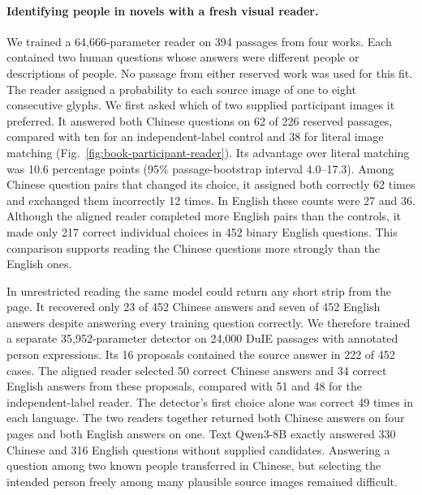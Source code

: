 \paragraph{Identifying people in novels with a fresh visual reader.}
We trained a 64,666-parameter reader on 394 passages from four works. Each contained two human questions whose answers were different people or descriptions of people. No passage from either reserved work was used for this fit. The reader assigned a probability to each source image of one to eight consecutive glyphs. We first asked which of two supplied participant images it preferred. It answered both Chinese questions on 62 of 226 reserved passages, compared with ten for an independent-label control and 38 for literal image matching (Fig.~\ref{fig:book-participant-reader}). Its advantage over literal matching was 10.6 percentage points (95\% passage-bootstrap interval 4.0--17.3). Among Chinese question pairs that changed its choice, it assigned both correctly 62 times and exchanged them incorrectly 12 times. In English these counts were 27 and 36. Although the aligned reader completed more English pairs than the controls, it made only 217 correct individual choices in 452 binary English questions. This comparison supports reading the Chinese questions more strongly than the English ones.

In unrestricted reading the same model could return any short strip from the page. It recovered only 23 of 452 Chinese answers and seven of 452 English answers despite answering every training question correctly. We therefore trained a separate 35,952-parameter detector on 24,000 DuIE passages with annotated person expressions. Its 16 proposals contained the source answer in 222 of 452 cases. The aligned reader selected 50 correct Chinese answers and 34 correct English answers from these proposals, compared with 51 and 48 for the independent-label reader. The detector's first choice alone was correct 49 times in each language. The two readers together returned both Chinese answers on four pages and both English answers on one. Text Qwen3-8B exactly answered 330 Chinese and 316 English questions without supplied candidates. Answering a question among two known people transferred in Chinese, but selecting the intended person freely among many plausible source images remained difficult.
